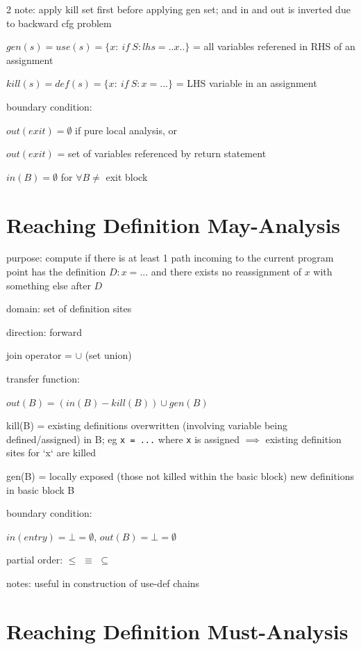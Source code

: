 \documentclass[8pt]{extarticle}
\begin{document}
\begin{multicols*}{2}
  note: apply kill set first before applying gen set; and in and out is inverted due to backward cfg problem

  $gen(s) = use(s) = \{ x:\ if\ S: lhs = .. x .. \}$ = all variables referened in RHS of an assignment

  $kill(s) = def(s) = \{ x:\ if\ S: x = ... \}$ = LHS variable in an assignment

  boundary condition:

  $out(exit) = \emptyset$ if pure local analysis, or

  $out(exit)$ = set of variables referenced by return statement

  $in(B) = \emptyset$ for $\forall B \neq$ exit block
  
  \vfill\null
  \columnbreak

  \section{Reaching Definition May-Analysis}

  purpose: compute if there is at least 1 path incoming to the current program point has the definition $D: x = ...$ and there exists no reassignment of $x$ with something else after $D$
  
  domain: set of definition sites
  
  direction: forward

  join operator = $\cup$ (set union)

  transfer function:

  $out(B) = (in(B) - kill(B)) \cup gen(B)$
  
  kill(B) = existing definitions overwritten (involving variable being defined/assigned) in B; eg \verb|x = ...| where \verb|x| is assigned $\implies$ existing definition sites for `x` are killed

  gen(B) = locally exposed (those not killed within the basic block) new definitions in basic block B

  boundary condition:

  $in(entry) = \bot = \emptyset$, $out(B) = \bot = \emptyset$

  partial order: $\leq$ $\equiv$ $\subseteq$

  notes: useful in construction of use-def chains

  \section{Reaching Definition Must-Analysis}


\end{multicols*}
\end{document}
